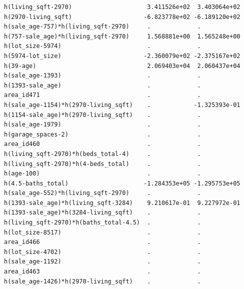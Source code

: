 \documentclass[
]{article}
\begin{document}
\begin{verbatim}
h(living_sqft-2970)                     3.411526e+02  3.403064e+02
h(2970-living_sqft)                    -6.823778e+02 -6.189120e+02
h(sale_age-757)*h(living_sqft-2970)     .             .           
h(757-sale_age)*h(living_sqft-2970)     1.568881e+00  1.565248e+00
h(lot_size-5974)                        .             .           
h(5974-lot_size)                       -2.360079e+02 -2.375167e+02
h(39-age)                               2.069403e+04  2.060437e+04
h(sale_age-1393)                        .             .           
h(1393-sale_age)                        .             .           
area_id471                              .             .           
h(sale_age-1154)*h(2970-living_sqft)    .            -1.325393e-01
h(1154-sale_age)*h(2970-living_sqft)    .             .           
h(sale_age-1979)                        .             .           
h(garage_spaces-2)                      .             .           
area_id460                              .             .           
h(living_sqft-2970)*h(beds_total-4)     .             .           
h(living_sqft-2970)*h(4-beds_total)     .             .           
h(age-100)                              .             .           
h(4.5-baths_total)                     -1.284353e+05 -1.295753e+05
h(sale_age-552)*h(living_sqft-2970)     .             .           
h(1393-sale_age)*h(living_sqft-3284)    9.210617e-01  9.227972e-01
h(1393-sale_age)*h(3284-living_sqft)    .             .           
h(living_sqft-2970)*h(baths_total-4.5)  .             .           
h(lot_size-8517)                        .             .           
area_id466                              .             .           
h(lot_size-4702)                        .             .           
h(sale_age-1192)                        .             .           
area_id463                              .             .           
h(sale_age-1426)*h(2970-living_sqft)    .             .           
                                                                  

\end{verbatim}
\end{document}
